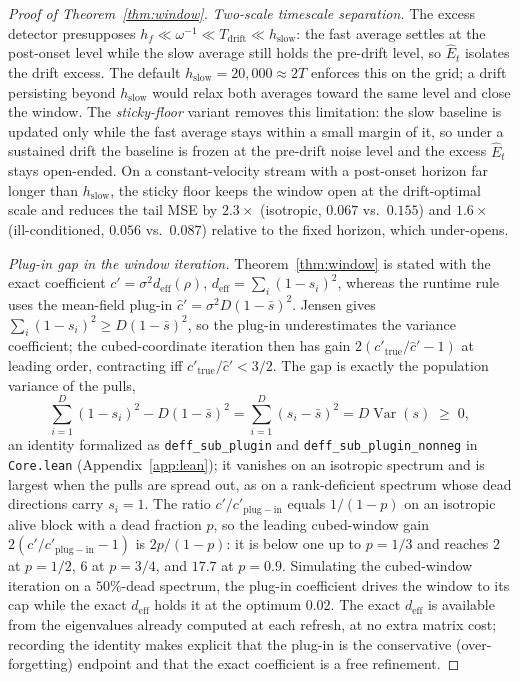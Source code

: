 \begin{proof}[Proof of Theorem~\ref{thm:window}]
\emph{Two-scale timescale separation.}
The excess detector presupposes $h_f \ll \omega^{-1} \ll T_{\mathrm{drift}} \ll h_{\mathrm{slow}}$: the fast average settles at the post-onset level while the slow average still holds the pre-drift level, so $\widehat E_t$ isolates the drift excess.
The default $h_{\mathrm{slow}} = 20{,}000 \approx 2T$ enforces this on the grid; a drift persisting beyond $h_{\mathrm{slow}}$ would relax both averages toward the same level and close the window.
The \emph{sticky-floor} variant removes this limitation: the slow baseline is updated only while the fast average stays within a small margin of it, so under a sustained drift the baseline is frozen at the pre-drift noise level and the excess $\widehat E_t$ stays open-ended. On a constant-velocity stream with a post-onset horizon far longer than $h_{\mathrm{slow}}$, the sticky floor keeps the window open at the drift-optimal scale and reduces the tail MSE by $2.3\times$ (isotropic, $0.067$ vs.\ $0.155$) and $1.6\times$ (ill-conditioned, $0.056$ vs.\ $0.087$) relative to the fixed horizon, which under-opens.

\emph{Plug-in gap in the window iteration.}
Theorem~\ref{thm:window} is stated with the exact coefficient $c' = \sigma^2 d_{\mathrm{eff}}(\rho)$, $d_{\mathrm{eff}} = \sum_i (1-s_i)^2$, whereas the runtime rule uses the mean-field plug-in $\widehat c' = \sigma^2 D(1-\bar s)^2$.
Jensen gives $\sum_i (1-s_i)^2 \ge D(1-\bar s)^2$, so the plug-in underestimates the variance coefficient; the cubed-coordinate iteration then has gain $2(c'_{\mathrm{true}}/\widehat c' - 1)$ at leading order, contracting iff $c'_{\mathrm{true}}/\widehat c' < 3/2$.
The gap is exactly the population variance of the pulls,
\[
\sum_{i=1}^D (1-s_i)^2 - D(1-\bar s)^2
= \sum_{i=1}^D (s_i-\bar s)^2 = D\operatorname{Var}(s) \;\ge\; 0,
\]
an identity formalized as \texttt{deff\_sub\_plugin} and \texttt{deff\_sub\_plugin\_nonneg} in \texttt{Core.lean} (Appendix~\ref{app:lean}); it vanishes on an isotropic spectrum and is largest when the pulls are spread out, as on a rank-deficient spectrum whose dead directions carry $s_i = 1$.
The ratio $c'/c'_{\mathrm{plug\!-\!in}}$ equals $1/(1-p)$ on an isotropic alive block with a dead fraction $p$, so the leading cubed-window gain $2(c'/c'_{\mathrm{plug\!-\!in}}-1)$ is $2p/(1-p)$: it is below one up to $p=1/3$ and reaches $2$ at $p=1/2$, $6$ at $p=3/4$, and $17.7$ at $p=0.9$. Simulating the cubed-window iteration on a $50\%$-dead spectrum, the plug-in coefficient drives the window to its cap while the exact $d_{\mathrm{eff}}$ holds it at the optimum $0.02$.
The exact $d_{\mathrm{eff}}$ is available from the eigenvalues already computed at each refresh, at no extra matrix cost; recording the identity makes explicit that the plug-in is the conservative (over-forgetting) endpoint and that the exact coefficient is a free refinement.


\end{proof}
